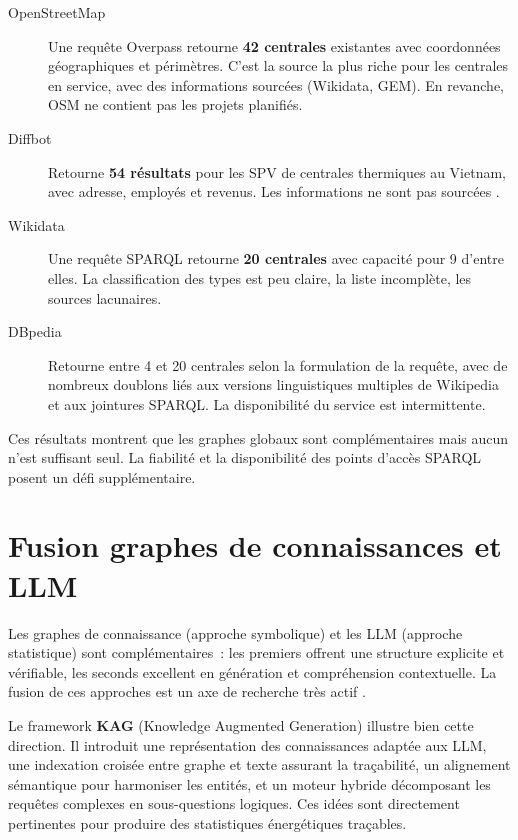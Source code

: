 \documentclass[a4paper,11pt]{report}
\begin{document}
\begin{description}
\item[OpenStreetMap] Une requête Overpass retourne \textbf{42 centrales} existantes avec coordonnées géographiques et périmètres. C'est la source la plus riche pour les centrales en service, avec des informations sourcées (Wikidata, GEM). En revanche, OSM ne contient pas les projets planifiés.
\item[Diffbot] Retourne \textbf{54 résultats} pour les SPV de centrales thermiques au Vietnam, avec adresse, employés et revenus. Les informations ne sont pas sourcées \citep{U6PVXXZP}.
\item[Wikidata] Une requête SPARQL retourne \textbf{20 centrales} avec capacité pour 9 d'entre elles. La classification des types est peu claire, la liste incomplète, les sources lacunaires.
\item[DBpedia] Retourne entre 4 et 20 centrales selon la formulation de la requête, avec de nombreux doublons liés aux versions linguistiques multiples de Wikipedia et aux jointures SPARQL. La disponibilité du service est intermittente.
\end{description}

Ces résultats montrent que les graphes globaux sont complémentaires mais aucun n'est suffisant seul. La fiabilité et la disponibilité des points d'accès SPARQL posent un défi supplémentaire.

\section{Fusion graphes de connaissances et LLM}

Les graphes de connaissance (approche symbolique) et les LLM (approche statistique) sont complémentaires~: les premiers offrent une structure explicite et vérifiable, les seconds excellent en génération et compréhension contextuelle. La fusion de ces approches est un axe de recherche très actif \citep{8U2Q2H5E,8XXG9DKM,HFQGE3UK,MNQFVIVR,D7EXWP53,THNWVF3G,E42E7D4X,AZ5B27ML,TDG5RFPC,MZNGHBPG}.

Le framework \textbf{KAG} (Knowledge Augmented Generation) \citep{74SRYH2Q} illustre bien cette direction. Il introduit une représentation des connaissances adaptée aux LLM, une indexation croisée entre graphe et texte assurant la traçabilité, un alignement sémantique pour harmoniser les entités, et un moteur hybride décomposant les requêtes complexes en sous-questions logiques. Ces idées sont directement pertinentes pour produire des statistiques énergétiques traçables.
\end{document}
